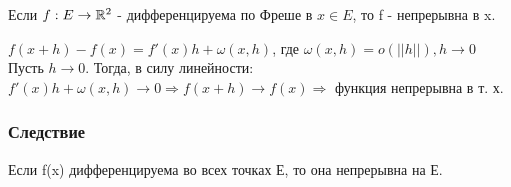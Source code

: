 \begin{teorema}
Если $f:E\to\mathbb{R}^2$ - дифференцируема по Фреше в $x\in E$, то f - непрерывна в x.
\end{teorema}
\dokvo
$f(x+h)-f(x)=f'(x)h+\omega(x,h)$, где $\omega(x,h) = o(||h||), h\to 0$
\\
Пусть $h\to 0$. Тогда, в силу линейности:
\\
$f'(x)h+\omega(x,h)\to 0\Rightarrow f(x+h)\to f(x) \Rightarrow$ функция непрерывна в т. х.
\\
\dokno

\subsubsection{Следствие}
Если f(x) дифференцируема во всех точках Е, то она непрерывна на Е.


